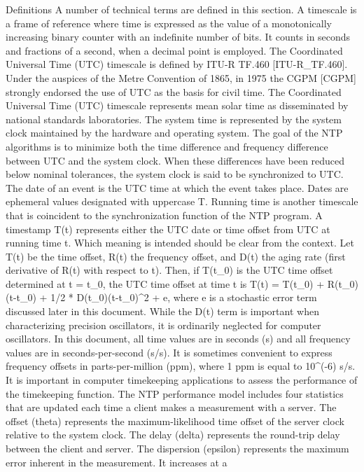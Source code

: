 Definitions
 A number of technical terms are defined in this section. A timescale
 is a frame of reference where time is expressed as the value of a
 monotonically increasing binary counter with an indefinite number of
 bits. It counts in seconds and fractions of a second, when a decimal
 point is employed. The Coordinated Universal Time (UTC) timescale is
 defined by ITU-R TF.460 [ITU-R_TF.460]. Under the auspices of the
 Metre Convention of 1865, in 1975 the CGPM [CGPM] strongly endorsed
 the use of UTC as the basis for civil time.
 The Coordinated Universal Time (UTC) timescale represents mean solar
 time as disseminated by national standards laboratories. The system
 time is represented by the system clock maintained by the hardware
 and operating system. The goal of the NTP algorithms is to minimize
 both the time difference and frequency difference between UTC and the
 system clock. When these differences have been reduced below nominal
 tolerances, the system clock is said to be synchronized to UTC.
The date of an event is the UTC time at which the event takes place.
 Dates are ephemeral values designated with uppercase T. Running time
 is another timescale that is coincident to the synchronization
 function of the NTP program.
 A timestamp T(t) represents either the UTC date or time offset from
 UTC at running time t. Which meaning is intended should be clear
 from the context. Let T(t) be the time offset, R(t) the frequency
 offset, and D(t) the aging rate (first derivative of R(t) with
 respect to t). Then, if T(t_0) is the UTC time offset determined at
 t = t_0, the UTC time offset at time t is
 T(t) = T(t_0) + R(t_0)(t-t_0) + 1/2 * D(t_0)(t-t_0)^2 + e,
 where e is a stochastic error term discussed later in this document.
 While the D(t) term is important when characterizing precision
 oscillators, it is ordinarily neglected for computer oscillators. In
 this document, all time values are in seconds (s) and all frequency
 values are in seconds-per-second (s/s). It is sometimes convenient
 to express frequency offsets in parts-per-million (ppm), where 1 ppm
 is equal to 10^(-6) s/s.
 It is important in computer timekeeping applications to assess the
 performance of the timekeeping function. The NTP performance model
 includes four statistics that are updated each time a client makes a
 measurement with a server. The offset (theta) represents the
 maximum-likelihood time offset of the server clock relative to the
 system clock. The delay (delta) represents the round-trip delay
 between the client and server. The dispersion (epsilon) represents
 the maximum error inherent in the measurement. It increases at a

